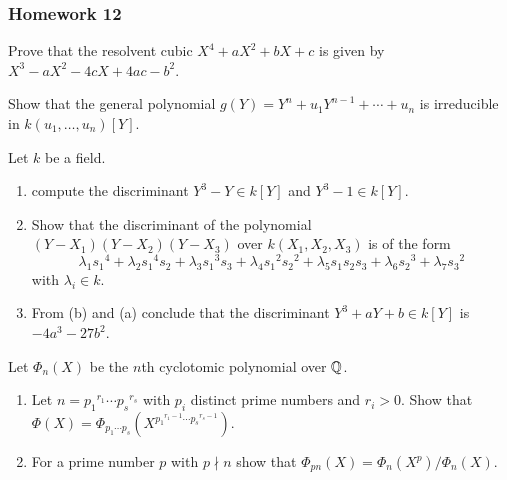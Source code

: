 \subsubsection{Homework 12}
\setcounter{exercise}{0}

\begin{problem}
  Prove that the resolvent cubic $X^4+aX^2+bX+c$ is given by
  $X^3-aX^2-4cX+4ac-b^2$.
\end{problem}
\begin{solution}
\end{solution}

\begin{problem}
  Show that the general polynomial $g(Y)=Y^n+u_1Y^{n-1}+\dotsb+u_n$ is
  irreducible in $k(u_1,\dotsc,u_n)[Y]$.
\end{problem}
\begin{solution}
\end{solution}

\begin{problem}
  Let $k$ be a field.
  \begin{enumerate}[label=(\alph*),noitemsep]
  \item compute the discriminant $Y^3-Y\in k[Y]$ and $Y^3-1\in k[Y]$.
  \item Show that the discriminant of the polynomial
    $(Y-X_1)(Y-X_2)(Y-X_3)$ over $k(X_1,X_2,X_3)$ is of the form
    \[
      \lambda_1{s_1}^4+\lambda_2{s_1}^4s_2+\lambda_3{s_1}^3s_3+\lambda_4{s_1}^2{s_2}^2+\lambda_5s_1s_2s_3+\lambda_6{s_2}^3+\lambda_7{s_3}^2
    \]
    with $\lambda_i\in k$.
  \item From (b) and (a) conclude that the discriminant
    $Y^3+aY+b\in k[Y]$ is $-4a^3-27b^2$.
\end{enumerate}
\end{problem}
\begin{solution}
\end{solution}

\begin{problem}
  Let $\Phi_n(X)$ be the $n$th cyclotomic polynomial over $\mathbb{Q}$.
  \begin{enumerate}[label=(\alph*),noitemsep]
  \item Let $n={p_1}^{r_1}\dotsm{p_s}^{r_s}$ with $p_i$ distinct prime
    numbers and $r_i>0$. Show that
    $\Phi(X)=\Phi_{p_1\dotsm p_s}(X^{{p_1}^{r_1-1}\dotsm{p_s}^{r_s-1}})$.
  \item For a prime number $p$ with $p\nmid n$ show that
    $\Phi_{pn}(X)=\Phi_n(X^p)/\Phi_n(X)$.
  \end{enumerate}
\end{problem}
\begin{solution}
\end{solution}

